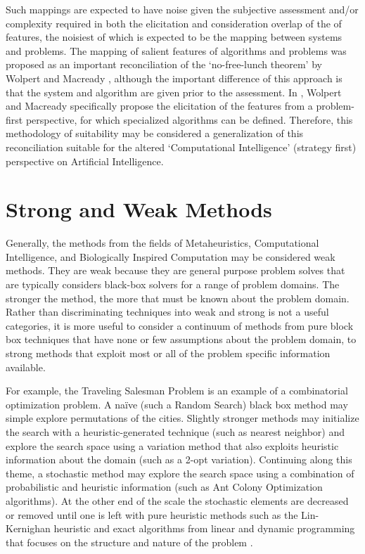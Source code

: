 \documentclass[a4paper, 11pt]{article}
\begin{document}
Such mappings are expected to have noise given the subjective assessment and/or complexity required in both the elicitation and consideration overlap of the of features, the noisiest of which is expected to be the mapping between systems and problems. 
The mapping of salient features of algorithms and problems was proposed as an important reconciliation of the `no-free-lunch theorem' by Wolpert and Macready \cite{Wolpert1997}, although the important difference of this approach is that the system and algorithm are given prior to the assessment. In \cite{Wolpert1995}, Wolpert and Macready specifically propose the elicitation of the features from a problem-first perspective, for which specialized algorithms can be defined. Therefore, this methodology of suitability may be considered a generalization of this reconciliation suitable for the altered `Computational Intelligence' (strategy first) perspective on Artificial Intelligence.

%
%
\section{Strong and Weak Methods}
\label{sec:strong_methods}
Generally, the methods from the fields of Metaheuristics, Computational Intelligence, and Biologically Inspired Computation may be considered weak methods. They are weak because they are general purpose problem solves that are typically considers black-box solvers for a range of problem domains. The stronger the method, the more that must be known about the problem domain.
Rather than discriminating techniques into weak and strong is not a useful categories, it is more useful to consider a continuum of methods from pure block box techniques that have none or few assumptions about the problem domain, to strong methods that exploit most or all of the problem specific information available.

For example, the Traveling Salesman Problem is an example of a combinatorial optimization problem. A na\"ive (such a Random Search) black box method may simple explore permutations of the cities. Slightly stronger methods may initialize the search with a heuristic-generated technique (such as nearest neighbor) and explore the search space using a variation method that also exploits heuristic information about the domain (such as a 2-opt variation). Continuing along this theme, a stochastic method may explore the search space using a combination of probabilistic and heuristic information (such as Ant Colony Optimization algorithms). At the other end of the scale the stochastic elements are decreased or removed until one is left with pure heuristic methods such as  the Lin-Kernighan heuristic \cite{Lin1973} and exact algorithms from linear and dynamic programming that focuses on the structure and nature of the problem \cite{Woeginger2003}.
\end{document}

